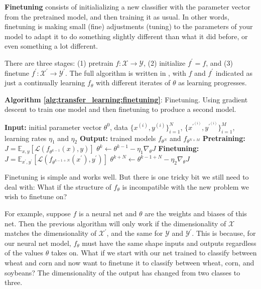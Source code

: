 \textbf{Finetuning} consists of initialializing a new classifier with the parameter vector from the pretrained model, and then training it as usual. In other words, finetuning is making small (fine) adjustments (tuning) to the parameters of your model to adapt it to do something slightly different than what it did before, or even something a lot different.

There are three stages: (1) pretrain $f: \mathcal{X} \rightarrow \mathcal{Y}$, (2) initialize $f^{\prime} = f$, and (3) finetune $f^{\prime}: \mathcal{X}^{\prime} \rightarrow \mathcal{Y}^{\prime}$. The full algorithm is written in \algref{\ref{alg:transfer_learning:finetuning}}, with $f$ and $f^{\prime}$ indicated as just a continually learning $f_{\theta}$ with different iterates of $\theta$ as learning progresses.

\begin{algorithm}[h]
\SetAlgoVlined
\DontPrintSemicolon
\caption{{\bf Algorithm \ref{alg:transfer_learning:finetuning}}: Finetuning. Using gradient descent to train one model and then finetuning to produce a second model.}
\fakealgorithmcaption{}
\label{alg:transfer_learning:finetuning}
{\bf Input:} initial parameter vector $\theta^{0}$, data $\{x^{(i)},y^{(i)}\}_{i=1}^N$, $\{x^{\prime^{(i)}},y^{\prime^{(i)}}\}_{i=1}^M$, learning rates $\eta_1$ and $\eta_2$\;
{\bf Output:} trained models $f_{\theta^{N}}$ and $f_{\theta^{N+M}}$\;
{\bf Pretraining:}  {
    $J = \mathbb{E}_{x,y}[\mathcal{L}(f_{\theta^{k-1}}(x),y)]$\;
    $\theta^{k} \leftarrow \theta^{k-1} - \eta_1 \nabla_{\theta} J$\;
}
{\bf Finetuning:}  {
    $J = \mathbb{E}_{x^{\prime},y^{\prime}}[\mathcal{L}(f_{\theta^{k-1+N}}(x^{\prime}),y^{\prime})]$\;
    $\theta^{k+N} \leftarrow \theta^{k-1+N} - \eta_2 \nabla_{\theta} J$\;
}
\end{algorithm}

Finetuning is simple and works well. But there is one tricky bit we still need to deal with: What if the structure of $f_{\theta}$ is incompatible with the new problem we wish to finetune on?

For example, suppose $f$ is a neural net and $\theta$ are the weights and biases of this net. Then the previous algorithm will only work if the dimensionality of $\mathcal{X}$ matches the dimensionality of $\mathcal{X}^{\prime}$, and the same for $\mathcal{Y}$ and $\mathcal{Y}^{\prime}$. This is because, for our neural net model, $f_{\theta}$ must have the same shape inputs and outputs regardless of the values $\theta$ takes on. What if we start with our net trained to classify between wheat and corn and now want to finetune it to classify between wheat, corn, and soybeans? The dimensionality of the output has changed from two classes to three.

